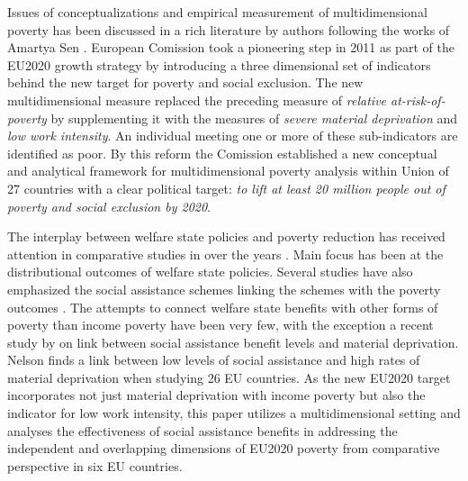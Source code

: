 \documentclass[11pt, a4paper]{article}\usepackage{graphicx, color}
\begin{document}

Issues of conceptualizations and empirical measurement of multidimensional poverty has been discussed in a rich literature by authors following the works of Amartya Sen \citep{sen_development_1999,anand_concepts_1997,atkinson_multidimensional_2003,deutsch_measuring_2005,thorbecke2008,alkire_counting_2010,ferreira_multidimensional_2012}. European Comission took a pioneering step in 2011 as part of the EU2020 growth strategy by introducing a three dimensional set of indicators behind the new target for poverty and social exclusion. The new multidimensional measure replaced the preceding measure of \emph{relative at-risk-of-poverty} by supplementing it with the measures of \emph{severe material deprivation} and \emph{low work intensity}. An individual meeting one or more of these sub-indicators are identified as poor. By this reform the Comission established a new conceptual and analytical framework for multidimensional poverty analysis within Union of 27 countries with a clear political target: \emph{to lift at least 20 million people out of poverty and social exclusion by 2020}. \citep{atkinson_income_2010}


The interplay between welfare state policies and poverty reduction has received attention in comparative studies in over the years \citep{mitchell_income_1991,korpi_paradox_1998,kenworthy_social-welfare_1999,kenworthy_progress_2011}. Main focus has been at the distributional outcomes of welfare state policies. Several studies have also emphasized the social assistance schemes linking the schemes with the poverty outcomes \citep{nelson_minimum_2009,behrendt_at_2002,kuivalainen_comparative_2004}. The attempts to connect welfare state benefits with other forms of poverty than income poverty have been very few, with the exception a recent study by \citet{nelson_counteracting_2012} on link between social assistance benefit levels and material deprivation. Nelson finds a link between low levels of social assistance and high rates of material deprivation when studying 26 EU countries. As the new EU2020 target incorporates not just material deprivation with income poverty but also the indicator for low work intensity, this paper utilizes a multidimensional setting and analyses the effectiveness of social assistance benefits in addressing the independent and overlapping dimensions of EU2020 poverty from comparative perspective in six EU countries. 
\end{document}
